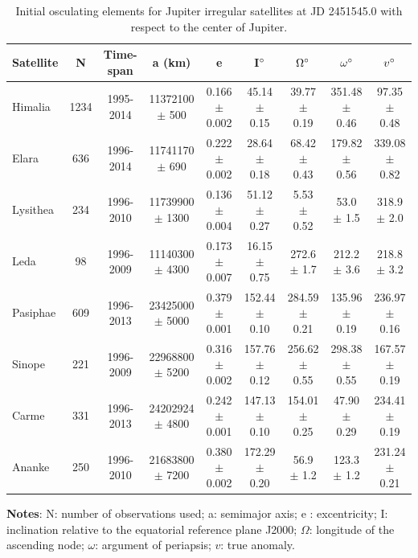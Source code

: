 \documentclass[useAMS,usenatbib]{mn2e}
\begin{document}
\begin{table}
\caption{Initial osculating elements for Jupiter irregular satellites at JD 2451545.0 with respect to the center of Jupiter.
 }\label{Tab: sat_ell}
\begin{center}
\begin{tabular}{lcccccccc}
\hline\hline
Satellite & N & Time-span & a (km) & e & I$\hbox{$^\circ$}$ & $\Omega\hbox{$^\circ$}$ & $\omega\hbox{$^\circ$}$ & $v\hbox{$^\circ$}$ \\ 
\hline
Himalia & 1234 & 1995-2014 &   11372100 $\pm$ 500    &    0.166 $\pm$ 0.002      &   45.14 $\pm$ 0.15      &   39.77 $\pm$ 0.19      &   351.48 $\pm$ 0.46      &   97.35 $\pm$ 0.48    \\
Elara & 636 & 1996-2014 &   11741170 $\pm$ 690  &      0.222 $\pm$ 0.002      &   28.64 $\pm$ 0.18      &   68.42 $\pm$ 0.43      &   179.82 $\pm$ 0.56      &   339.08 $\pm$ 0.82  \\
Lysithea & 234 & 1996-2010 &   11739900 $\pm$ 1300  &      0.136 $\pm$ 0.004      &    51.12 $\pm$ 0.27     &   5.53 $\pm$ 0.52      &   53.0 $\pm$ 1.5      &   318.9 $\pm$ 2.0   \\
Leda & 98 & 1996-2009 &   11140300  $\pm$ 4300  &     0.173  $\pm$ 0.007     &   16.15  $\pm$ 0.75    &   272.6  $\pm$ 1.7    &   212.2  $\pm$ 3.6          &   218.8  $\pm$ 3.2  \\
Pasiphae & 609 & 1996-2013 &  23425000  $\pm$ 5000    &     0.379  $\pm$ 0.001       &   152.44 $\pm$ 0.10      &   284.59 $\pm$ 0.21      &   135.96 $\pm$ 0.19      &   236.97 $\pm$ 0.16 \\
Sinope & 221 & 1996-2009 &   22968800 $\pm$ 5200   &     0.316 $\pm$ 0.002      &   157.76 $\pm$ 0.12      &   256.62 $\pm$ 0.55      &   298.38 $\pm$ 0.55      &   167.57 $\pm$ 0.19    \\
Carme & 331 & 1996-2013 &   24202924 $\pm$ 4800      &  0.242 $\pm$ 0.001      &   147.13 $\pm$ 0.10      &   154.01 $\pm$ 0.25      &   47.90 $\pm$ 0.29      &   234.41 $\pm$ 0.19  \\
Ananke & 250 & 1996-2010 &  21683800  $\pm$ 7200  &     0.380 $\pm$ 0.002      &   172.29 $\pm$ 0.20      &   56.9 $\pm$ 1.2      &   123.3 $\pm$ 1.2      &   231.24 $\pm$ 0.21  \\
\hline
\end{tabular} 
\end{center}
\begin{flushleft}
\textbf{Notes}: N: number of observations used; a: semimajor axis; e : excentricity; I: inclination relative to the equatorial reference plane J2000; $\Omega$: longitude of the ascending node; $\omega$: argument of periapsis; $v$: true anomaly.
\end{flushleft}
\end{table}
\end{document}

